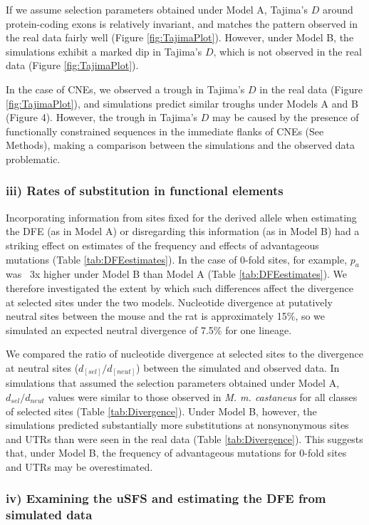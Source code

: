 	If we assume selection parameters obtained under Model A, Tajima’s $D$ around protein-coding exons is relatively invariant, and matches the pattern observed in the real data fairly well (Figure \ref{fig:TajimaPlot}). However, under Model B, the simulations exhibit a marked dip in Tajima’s $D$, which is not observed in the real data (Figure \ref{fig:TajimaPlot}).

	In the case of CNEs, we observed a trough in Tajima’s $D$ in the real data (Figure \ref{fig:TajimaPlot}), and simulations predict similar troughs under Models A and B (Figure 4). However, the trough in Tajima’s $D$ may be caused by the presence of functionally constrained sequences in the immediate flanks of CNEs (See Methods), making a comparison between the simulations and the observed data problematic.

\subsubsection{iii) Rates of substitution in functional elements}

Incorporating information from sites fixed for the derived allele when estimating the DFE (as in Model A) or disregarding this information (as in Model B) had a striking effect on estimates of the frequency and effects of advantageous mutations (Table \ref{tab:DFEestimates}). In the case of 0-fold sites, for example, $p_a$ was ~3x higher under Model B than Model A (Table \ref{tab:DFEestimates}). We therefore investigated the extent by which such differences affect the divergence at selected sites under the two models. Nucleotide divergence at putatively neutral sites between the mouse and the rat is approximately 15\%, so we simulated an expected neutral divergence of 7.5\% for one lineage. 

We compared the ratio of nucleotide divergence at selected sites to the divergence at neutral sites ($d_[sel]/d_[neut]$) between the simulated and observed data. In simulations that assumed the selection parameters obtained under Model A, $d_{sel}/d_{neut}$ values were similar to those observed in \textit{M. m. castaneus} for all classes of selected sites (Table \ref{tab:Divergence}). Under Model B, however, the simulations predicted substantially more substitutions at nonsynonymous sites and UTRs than were seen in the real data (Table \ref{tab:Divergence}). This suggests that, under Model B, the frequency of advantageous mutations for 0-fold sites and UTRs may be overestimated.

\subsubsection{iv) Examining the uSFS and estimating the DFE from simulated data}

